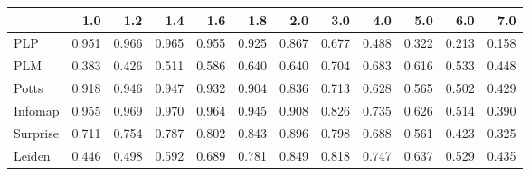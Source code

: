 \begin{tabular}{lrrrrrrrrrrr}
\toprule
{} &   1.0 &   1.2 &   1.4 &   1.6 &   1.8 &   2.0 &   3.0 &   4.0 &   5.0 &   6.0 &   7.0 \\
\midrule
PLP      & 0.951 & 0.966 & 0.965 & 0.955 & 0.925 & 0.867 & 0.677 & 0.488 & 0.322 & 0.213 & 0.158 \\
PLM      & 0.383 & 0.426 & 0.511 & 0.586 & 0.640 & 0.640 & 0.704 & 0.683 & 0.616 & 0.533 & 0.448 \\
Potts    & 0.918 & 0.946 & 0.947 & 0.932 & 0.904 & 0.836 & 0.713 & 0.628 & 0.565 & 0.502 & 0.429 \\
Infomap  & 0.955 & 0.969 & 0.970 & 0.964 & 0.945 & 0.908 & 0.826 & 0.735 & 0.626 & 0.514 & 0.390 \\
Surprise & 0.711 & 0.754 & 0.787 & 0.802 & 0.843 & 0.896 & 0.798 & 0.688 & 0.561 & 0.423 & 0.325 \\
Leiden   & 0.446 & 0.498 & 0.592 & 0.689 & 0.781 & 0.849 & 0.818 & 0.747 & 0.637 & 0.529 & 0.435 \\
\bottomrule
\end{tabular}
